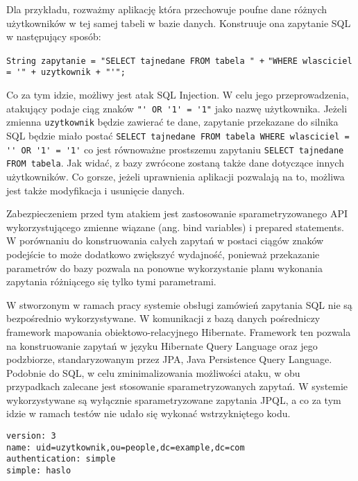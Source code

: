 	\lstset{language=Java}
	
	Dla przykładu, rozważmy aplikację która przechowuje poufne dane różnych użytkowników w tej samej tabeli w bazie danych. Konstruuje ona zapytanie SQL w następujący sposób:
	
	\lstinline|String zapytanie = "SELECT tajnedane FROM tabela " +| 
	\lstinline|"WHERE wlasciciel = '" + uzytkownik + "'";|
	
	Co za tym idzie, możliwy jest atak SQL Injection. W celu jego przeprowadzenia, atakujący podaje ciąg znaków \lstinline|"' OR '1' = '1"| jako nazwę użytkownika. Jeżeli zmienna \texttt{uzytkownik} będzie zawierać te dane, zapytanie przekazane do silnika SQL będzie miało postać
	\lstset{language=SQL}
	\lstinline|SELECT tajnedane FROM tabela WHERE wlasciciel = '' OR '1' = '1'| 
	co jest równoważne prostszemu zapytaniu
	\lstinline|SELECT tajnedane FROM tabela|.
	Jak widać, z bazy zwrócone zostaną także dane dotyczące innych użytkowników. Co gorsze, jeżeli uprawnienia aplikacji pozwalają na to, możliwa jest także modyfikacja i usunięcie danych.

	Zabezpieczeniem przed tym atakiem jest zastosowanie sparametryzowanego API wykorzystującego zmienne wiązane (ang. bind variables) i prepared statements\cite{BindVariables}. W porównaniu do konstruowania całych zapytań w postaci ciągów znaków podejście to może dodatkowo zwiększyć wydajność, ponieważ przekazanie parametrów do bazy pozwala na ponowne wykorzystanie planu wykonania zapytania różniącego się tylko tymi parametrami.

	W stworzonym w ramach pracy systemie obsługi zamówień  zapytania SQL nie są bezpośrednio wykorzystywane. W komunikacji z bazą danych pośredniczy framework mapowania obiektowo-relacyjnego Hibernate. Framework ten pozwala na konstruowanie zapytań w języku Hibernate Query Language oraz jego podzbiorze, standaryzowanym przez JPA, Java Persistence Query Language. Podobnie do SQL, w celu zminimalizowania możliwości ataku, w obu przypadkach zalecane jest stosowanie sparametryzowanych zapytań. W systemie wykorzystywane są wyłącznie sparametryzowane zapytania JPQL, a co za tym idzie w ramach testów nie udało się wykonać wstrzykniętego kodu.
	
	\begin{lstlisting}
version: 3
name: uid=uzytkownik,ou=people,dc=example,dc=com
authentication: simple
simple: haslo
	\end{lstlisting}
	

